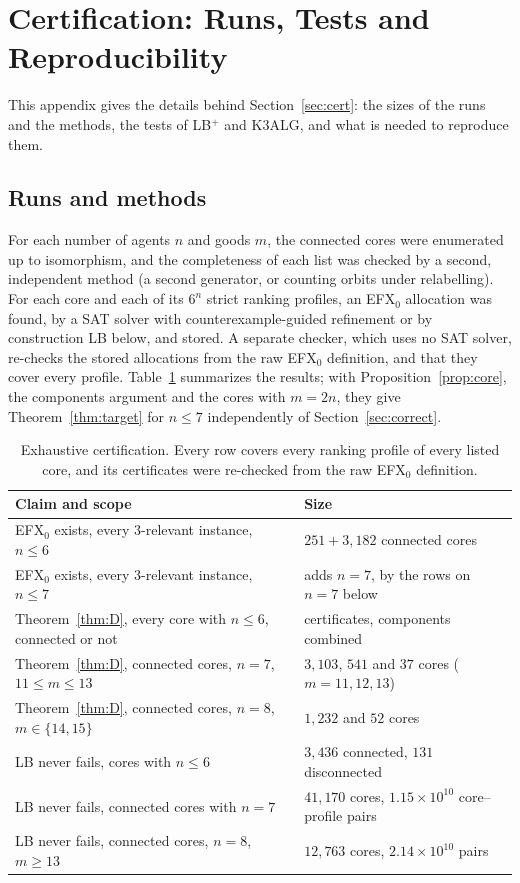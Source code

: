 \documentclass[runningheads,11pt]{llncs}
\newcommand{\efxz}{\texorpdfstring{\mbox{EFX$_0$}}{EFX0}}
\newcommand{\LBp}{\texorpdfstring{\mbox{LB$^{+}$}}{LB+}}
\begin{document}
\section{Certification: Runs, Tests and Reproducibility}\label{app:cert}

This appendix gives the details behind Section~\ref{sec:cert}: the sizes of the runs and the methods, the tests of \LBp{} and K3ALG, and what is needed to reproduce them.

\subsection{Runs and methods}

For each number of agents $n$ and goods $m$, the connected cores were enumerated up to isomorphism, and the completeness of each list was checked by a second, independent method (a second generator, or counting orbits under relabelling). For each core and each of its $6^n$ strict ranking profiles, an \efxz{} allocation was found, by a SAT solver with counterexample-guided refinement or by construction LB below, and stored. A separate checker, which uses no SAT solver, re-checks the stored allocations from the raw \efxz{} definition, and that they cover every profile. Table~\ref{tab:cert} summarizes the results; with Proposition~\ref{prop:core}, the components argument and the cores with $m=2n$, they give Theorem~\ref{thm:target} for $n\le7$ independently of Section~\ref{sec:correct}.

\begin{table}[tbp]
\caption{Exhaustive certification. Every row covers every ranking profile of every listed core, and its certificates were re-checked from the raw \efxz{} definition.}\label{tab:cert}
\centering\small
\setlength{\tabcolsep}{4pt}\begin{tabular}{@{}>{\raggedright\arraybackslash}p{}>{\raggedright\arraybackslash}p{}@{}}
\toprule
Claim and scope & Size \\
\midrule
\efxz{} exists, every $3$-relevant instance, $n\le6$ & $251+3{,}182$ connected cores \\
\efxz{} exists, every $3$-relevant instance, $n\le7$ & adds $n=7$, by the rows on $n=7$ below \\
Theorem~\ref{thm:D}, every core with $n\le6$, connected or not & certificates, components combined \\
Theorem~\ref{thm:D}, connected cores, $n=7$, $11\le m\le13$ & $3{,}103$, $541$ and $37$ cores ($m=11,12,13$) \\
Theorem~\ref{thm:D}, connected cores, $n=8$, $m\in\{14,15\}$ & $1{,}232$ and $52$ cores \\
LB never fails, cores with $n\le6$ & $3{,}436$ connected, $131$ disconnected \\
LB never fails, connected cores with $n=7$ & $41{,}170$ cores, $1.15\times10^{10}$ core--profile pairs \\
LB never fails, connected cores, $n=8$, $m\ge13$ & $12{,}763$ cores, $2.14\times10^{10}$ pairs \\
\bottomrule
\end{tabular}
\end{table}
\end{document}
